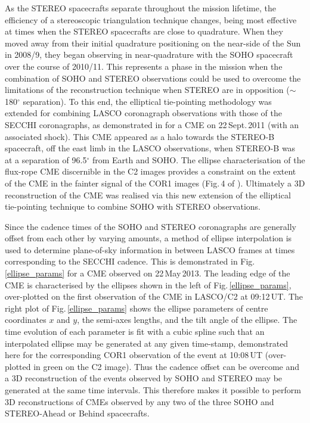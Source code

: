 \documentclass[preprint2]{aastex}
\begin{document}
As the STEREO spacecrafts separate throughout the mission lifetime, the efficiency of a stereoscopic triangulation technique changes, being most effective at times when the STEREO spacecrafts are close to quadrature. When they moved away from their initial quadrature positioning on the near-side of the Sun in 2008/9, they began observing in near-quadrature with the SOHO spacecraft over the course of 2010/11. This represents a phase in the mission when the combination of SOHO and STEREO observations could be used to overcome the limitations of the reconstruction technique when STEREO are in opposition ($\sim$180$^{\circ}$ separation). To this end, the elliptical tie-pointing methodology was extended for combining LASCO coronagraph observations with those of the SECCHI coronagraphs, as demonstrated in \citet{2013NatPh...9..811C} for a CME on 22\,Sept.\,2011 (with an associated shock). This CME appeared as a halo towards the STEREO-B spacecraft, off the east limb in the LASCO observations, when STEREO-B was at a separation of 96.5$^{\circ}$ from Earth and SOHO. The ellipse characterisation of the flux-rope CME discernible in the C2 images provides a constraint on the extent of the CME in the fainter signal of the COR1 images (Fig.\,4 of \citealt{2013NatPh...9..811C}). Ultimately a 3D reconstruction of the CME was realised via this new extension of the elliptical tie-pointing technique to combine SOHO with STEREO observations.

Since the cadence times of the SOHO and STEREO coronagraphs are generally offset from each other by varying amounts, a method of ellipse interpolation is used to determine plane-of-sky information in between LASCO frames at times corresponding to the SECCHI cadence. This is demonstrated in Fig.\,\ref{ellipse_params} for a CME observed on 22\,May\,2013. The leading edge of the CME is characterised by the ellipses shown in the left of Fig.\,\ref{ellipse_params}, over-plotted on the first observation of the CME in LASCO/C2 at 09:12\,UT. The right plot of Fig.\,\ref{ellipse_params} shows the ellipse parameters of centre coordinates $x$ and $y$, the semi-axes lengths, and the tilt angle of the ellipse. The time evolution of each parameter is fit with a cubic spline such that an interpolated ellipse may be generated at any given time-stamp, demonstrated here for the corresponding COR1 observation of the event at 10:08\,UT (over-plotted in green on the C2 image). Thus the cadence offset can be overcome and a 3D reconstruction of the events observed by SOHO and STEREO may be generated at the same time intervals. This therefore makes it possible to perform 3D reconstructions of CMEs observed by any two of the three SOHO and STEREO-Ahead or Behind spacecrafts. 
\end{document}
